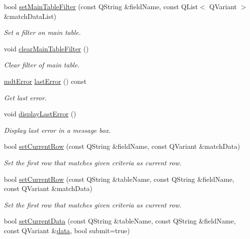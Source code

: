 \begin{DoxyCompactItemize}
bool \hyperlink{classmdt_sql_form_a61c0a1a4a2c53ca5571168e9761adff8}{set\-Main\-Table\-Filter} (const Q\-String \&field\-Name, const Q\-List$<$ Q\-Variant $>$ \&match\-Data\-List)
\begin{DoxyCompactList}\small\item\em Set a filter on main table. \end{DoxyCompactList}\item 
void \hyperlink{classmdt_sql_form_a37cd63844276e50bda58fe8edafc704e}{clear\-Main\-Table\-Filter} ()
\begin{DoxyCompactList}\small\item\em Clear filter of main table. \end{DoxyCompactList}\item 
\hyperlink{classmdt_error}{mdt\-Error} \hyperlink{classmdt_sql_form_a04724293298421c404e93c58015cda5e}{last\-Error} () const 
\begin{DoxyCompactList}\small\item\em Get last error. \end{DoxyCompactList}\item 
void \hyperlink{classmdt_sql_form_a7521d231f24663ee1d2acb904387353b}{display\-Last\-Error} ()
\begin{DoxyCompactList}\small\item\em Display last error in a message box. \end{DoxyCompactList}\item 
bool \hyperlink{classmdt_sql_form_a268cedc485a92877a551cee34cf0eecc}{set\-Current\-Row} (const Q\-String \&field\-Name, const Q\-Variant \&match\-Data)
\begin{DoxyCompactList}\small\item\em Set the first row that matches given criteria as current row. \end{DoxyCompactList}\item 
bool \hyperlink{classmdt_sql_form_abd4c01483812a53edc4be116a7dd2612}{set\-Current\-Row} (const Q\-String \&table\-Name, const Q\-String \&field\-Name, const Q\-Variant \&match\-Data)
\begin{DoxyCompactList}\small\item\em Set the first row that matches given criteria as current row. \end{DoxyCompactList}\item 
bool \hyperlink{classmdt_sql_form_aa377e70f4a2e865b0b696957c0fca766}{set\-Current\-Data} (const Q\-String \&table\-Name, const Q\-String \&field\-Name, const Q\-Variant \&\hyperlink{classmdt_sql_form_a0c27d6a9ecbf0589f313c7193c632a62}{data}, bool submit=true)

\end{DoxyCompactItemize}
